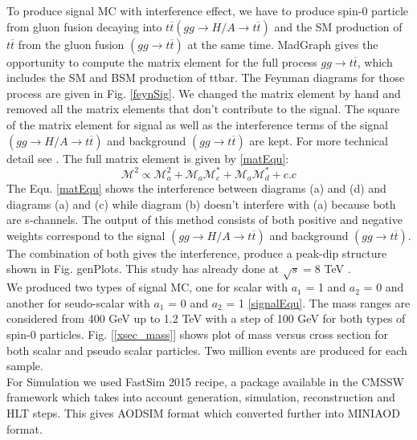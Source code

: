 \documentclass{cmspaper}
\begin{document}
To produce signal MC with interference effect, we have to produce spin-0 particle from gluon fusion decaying into $t\overline{t} ( gg \rightarrow H/A \rightarrow t\overline{t} )$ and the SM production of $t\overline{t}$ from the gluon fusion $( gg \rightarrow t\overline{t} )$ at the same time. MadGraph gives the opportunity to compute the matrix element for the full process $gg \rightarrow t\overline{t}$, which includes the SM and BSM production of ttbar. The Feynman diagrams for those process are given in Fig. \ref{feynSig}. We changed the matrix element by hand and removed all the matrix elements that don’t contribute to the signal. The square of the matrix element for signal as well as the interference terms of the signal $( gg \rightarrow H/A \rightarrow t\overline{t} )$ and background $( gg \rightarrow t\overline{t} )$ are kept. For more technical detail see \cite{signal4}. The full matrix element is given by \ref{matEqu}:
\begin{equation}\label{matEqu}
\mathcal{M}^{2} \propto \mathcal{M}^{2}_{a} + \mathcal{M}_{a}\mathcal{M}^{*}_{c} + \mathcal{M}_{a}\mathcal{M}^{*}_{d} + c.c
\end{equation}
The Equ. \ref{matEqu} shows the interference between diagrams (a) and (d) and diagrams (a) and (c) while diagram (b) doesn’t interfere with (a) because both are s-channels. The output of this method consists of both positive and negative weights correspond to the signal $( gg \rightarrow H/A \rightarrow t\overline{t} )$ and background $( gg \rightarrow t\overline{t} )$. The combination of both gives the interference, produce a peak-dip structure shown in Fig. {genPlots}. This study has already done at $\sqrt{s} = 8$ TeV \cite{sabisteinPAS}.\\
We produced two types of signal MC, one for scalar with $a_{1}$ = 1 and $a_{2}$ = 0 and another for seudo-scalar with $a_{1}$ = 0 and $a_{2}$ = 1 \ref{signalEqu}. The mass ranges are considered from 400 GeV up to 1.2 TeV with a step of 100 GeV for both types of spin-0 particles. Fig. [\ref{xsec_mass}] shows plot of mass versus cross section for both scalar and pseudo scalar particles. Two million events are produced for each sample.\\
For Simulation we used FastSim 2015 recipe\cite{fastsim}, a package available in the CMSSW framework which takes into account generation, simulation, reconstruction and HLT steps. This gives AODSIM format which converted further into MINIAOD format. 
\end{document}
